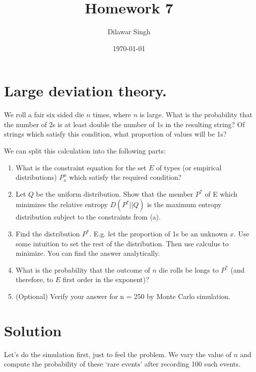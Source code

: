 \documentclass[]{article}
\title{Homework 7}
\author{Dilawar Singh}
\date{\today}
\begin{document}
\maketitle

\section{Large deviation theory.}\label{large-deviation-theory.}

We roll a fair six sided die \(n\) times, where \(n\) is large. What is
the probability that the number of 2s is at least double the number of
1s in the resulting string? Of strings which satisfy this condition,
what proportion of values will be 1s?

We can split this calculation into the following parts:

\begin{enumerate}
\def\labelenumi{\alph{enumi}.}
\item
  What is the constraint equation for the set \(E\) of types (or
  empirical distributions) \(P_x^n\) which satisfy the required
  condition?
\item
  Let \(Q\) be the uniform distribution. Show that the member \(P^*\) of
  E which minimizes the relative entropy \(D(P^*||Q)\) is the maximum
  entropy distribution subject to the constraints from (a).
\item
  Find the distribution \(P^*\). E.g. let the proportion of 1s be an
  unknown \(x\). Use some intuition to set the rest of the distribution.
  Then use calculus to minimize. You can find the answer analytically.
\item
  What is the probability that the outcome of \(n\) die rolls be longs
  to \(P^*\) (and therefore, to \(E\) first order in the exponent)?
\item
  (Optional) Verify your answer for n = 250 by Monte Carlo simulation.
\end{enumerate}

\section{Solution}\label{solution}

Let's do the simulation first, just to feel the problem. We vary the
value of \(n\) and compute the probability of these `rare events' after
recording 100 such events.
\end{document}

